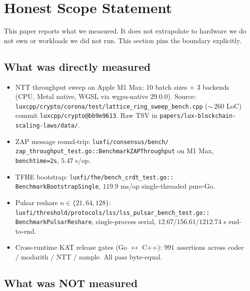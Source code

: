 \section{Honest Scope Statement}
\label{sec:honesty}

This paper reports what we measured. It does not extrapolate to
hardware we do not own or workloads we did not run. This section
pins the boundary explicitly.

\subsection{What was directly measured}

\begin{itemize}[nosep,leftmargin=2em]
\item NTT throughput sweep on Apple M1 Max: 10 batch sizes $\times$
3 backends (CPU, Metal native, WGSL via wgpu-native 29.0.0). Source:
\texttt{luxcpp/crypto/corona/test/lattice\_ring\_sweep\_bench.cpp}
($\sim$\,260 LoC) commit \texttt{luxcpp/crypto@bb9e9613}. Raw TSV in
\texttt{papers/lux-blockchain-scaling-laws/data/}.

\item ZAP message round-trip: \texttt{luxfi/consensus/bench/
zap\_throughput\_test.go::BenchmarkZAPThroughput} on M1 Max,
\texttt{benchtime=2s}, $5.47$ \textmu s/op.

\item TFHE bootstrap: \texttt{luxfi/fhe/bench\_crdt\_test.go::
BenchmarkBootstrapSingle}, $119.9$ ms/op single-threaded pure-Go.

\item Pulsar reshare $n \in \{21, 64, 128\}$:
\texttt{luxfi/threshold/protocols/lss/lss\_pulsar\_bench\_test.go::
BenchmarkPulsarReshare}, single-process serial, $12.67$/$156.61$/$1212.74$ s
end-to-end.

\item Cross-runtime KAT release gates (Go $\leftrightarrow$ C++):
$991$ assertions across codec / modarith / NTT / sample. All pass
byte-equal.
\end{itemize}

\subsection{What was NOT measured}

